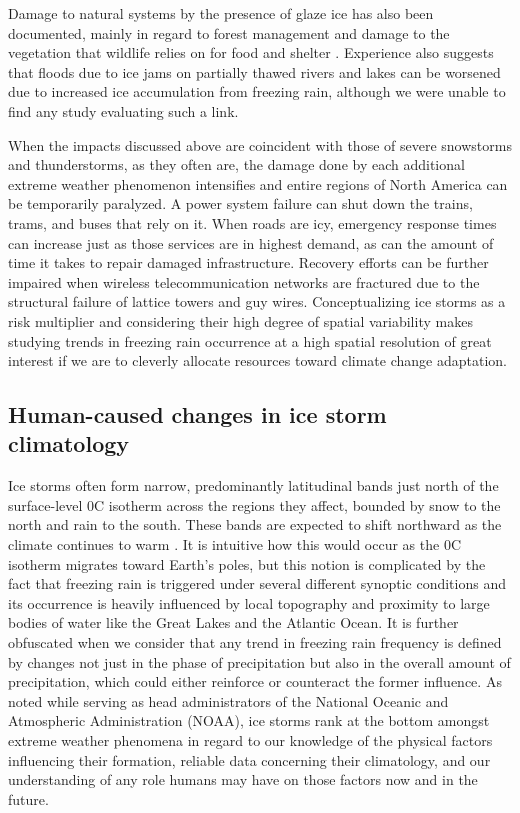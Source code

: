 \documentclass[twocol]{ametsoc}
\begin{document}
Damage to natural systems by the presence of glaze ice has also been documented, mainly in regard to forest management and damage to the vegetation that wildlife relies on for food and shelter \citep{pellikka2000modelling,proulx2001relationship}. Experience also suggests that floods due to ice jams on partially thawed rivers and lakes can be worsened due to increased ice accumulation from freezing rain, although we were unable to find any study evaluating such a link. 

When the impacts discussed above are coincident with those of severe snowstorms and thunderstorms, as they often are, the damage done by each additional extreme weather phenomenon intensifies and entire regions of North America can be temporarily paralyzed. A power system failure can shut down the trains, trams, and buses that rely on it. When roads are icy, emergency response times can increase just as those services are in highest demand, as can the amount of time it takes to repair damaged infrastructure. Recovery efforts can be further impaired when wireless telecommunication networks are fractured due to the structural failure of lattice towers and guy wires. Conceptualizing ice storms as a risk multiplier and considering their high degree of spatial variability makes studying trends in freezing rain occurrence at a high spatial resolution of great interest if we are to cleverly allocate resources toward climate change adaptation.

\subsection{Human-caused changes in ice storm climatology}
Ice storms often form narrow, predominantly latitudinal bands just north of the surface-level 0\degree C isotherm across the regions they affect, bounded by snow to the north and rain to the south. These bands are expected to shift northward as the climate continues to warm \citep{cheng2011possible,lambert2011simulated}. It is intuitive how this would occur as the 0\degree C isotherm migrates toward Earth's poles, but this notion is complicated by the fact that freezing rain is triggered under several different synoptic conditions and its occurrence is heavily influenced by local topography and proximity to large bodies of water like the Great Lakes and the Atlantic Ocean. It is further obfuscated when we consider that any trend in freezing rain frequency is defined by changes not just in the phase of precipitation but also in the overall amount of precipitation, which could either reinforce or counteract the former influence. As \citet{lubchenco2012extreme} noted while serving as head administrators of the National Oceanic and Atmospheric Administration (NOAA), ice storms rank at the bottom amongst extreme weather phenomena in regard to our knowledge of the physical factors influencing their formation, reliable data concerning their climatology, and our understanding of any role humans may have on those factors now and in the future.
\end{document}
